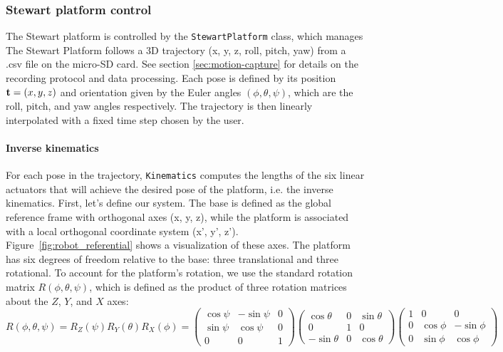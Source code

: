\subsubsection{Stewart platform control}

The Stewart platform is controlled by the \texttt{StewartPlatform} class, which manages 
The Stewart Platform follows a 3D trajectory (x, y, z, roll, pitch, yaw) from a .csv file on the micro-SD card.
See section \ref{sec:motion-capture} for details on the recording protocol and data processing.
Each pose is defined by its position ${\bf t}=(x,y,z)$ and orientation given by the Euler angles $(\phi,\theta,\psi)$,
 which are the roll, pitch, and yaw angles respectively.
The trajectory is then linearly interpolated with a fixed time step chosen by the user.

\paragraph{Inverse kinematics}
For each pose in the trajectory, \texttt{Kinematics} computes the lengths of the six linear actuators that will achieve 
the desired pose of the platform, i.e. the inverse kinematics. First, let's define our system. The base is defined as the 
global reference frame with orthogonal axes (x, y, z), while the platform is associated with a local orthogonal coordinate 
system (x', y', z'). Figure~\ref{fig:robot_referential} shows a visualization of these axes. The platform has six degrees 
of freedom relative to the base: three translational and three rotational. To account for the platform's rotation, we use the 
standard rotation matrix $R(\phi,\theta,\psi)$, which is defined as the product of three rotation matrices about 
the $Z$, $Y$, and $X$ axes:
\[
R(\phi,\theta,\psi) = R_Z(\psi) R_Y(\theta) R_X(\phi) =
\begin{pmatrix}
\cos\psi & -\sin\psi & 0 \\
\sin\psi & \cos\psi & 0 \\
0 & 0 & 1
\end{pmatrix}
\begin{pmatrix}
\cos\theta & 0 & \sin\theta \\
0 & 1 & 0 \\
-\sin\theta & 0 & \cos\theta
\end{pmatrix}
\begin{pmatrix}
1 & 0 & 0 \\
0 & \cos\phi & -\sin\phi \\
0 & \sin\phi & \cos\phi
\end{pmatrix}
\]

